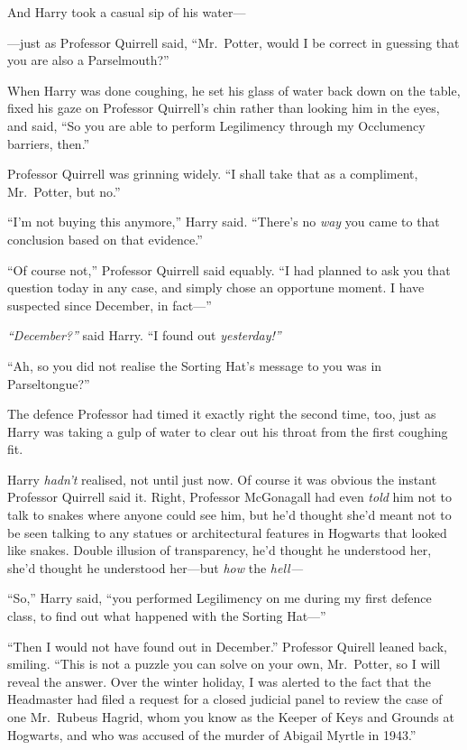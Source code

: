 And Harry took a casual sip of his water---

---just as Professor Quirrell said, ``Mr.~Potter, would I be correct in
guessing that you are also a Parselmouth?''

When Harry was done coughing, he set his glass of water back down on the
table, fixed his gaze on Professor Quirrell's chin rather than looking
him in the eyes, and said, ``So you are able to perform Legilimency
through my Occlumency barriers, then.''

Professor Quirrell was grinning widely. ``I shall take that as a
compliment, Mr.~Potter, but no.''

``I'm not buying this anymore,'' Harry said. ``There's no \emph{way} you
came to that conclusion based on that evidence.''

``Of course not,'' Professor Quirrell said equably. ``I had planned to
ask you that question today in any case, and simply chose an opportune
moment. I have suspected since December, in fact---''

\emph{``December?''} said Harry. ``I found out \emph{yesterday!''}

``Ah, so you did not realise the Sorting Hat's message to you was in
Parseltongue?''

The defence Professor had timed it exactly right the second time, too,
just as Harry was taking a gulp of water to clear out his throat from
the first coughing fit.

Harry \emph{hadn't} realised, not until just now. Of course it was
obvious the instant Professor Quirrell said it. Right, Professor
McGonagall had even \emph{told} him not to talk to snakes where anyone
could see him, but he'd thought she'd meant not to be seen talking to
any statues or architectural features in Hogwarts that looked like
snakes. Double illusion of transparency, he'd thought he understood her,
she'd thought he understood her---but \emph{how} the \emph{hell---}

``So,'' Harry said, ``you performed Legilimency on me during my first
defence class, to find out what happened with the Sorting Hat---''

``Then I would not have found out in December.'' Professor Quirell
leaned back, smiling. ``This is not a puzzle you can solve on your own,
Mr.~Potter, so I will reveal the answer. Over the winter holiday, I was
alerted to the fact that the Headmaster had filed a request for a closed
judicial panel to review the case of one Mr.~Rubeus Hagrid, whom you
know as the Keeper of Keys and Grounds at Hogwarts, and who was accused
of the murder of Abigail Myrtle in 1943.''

